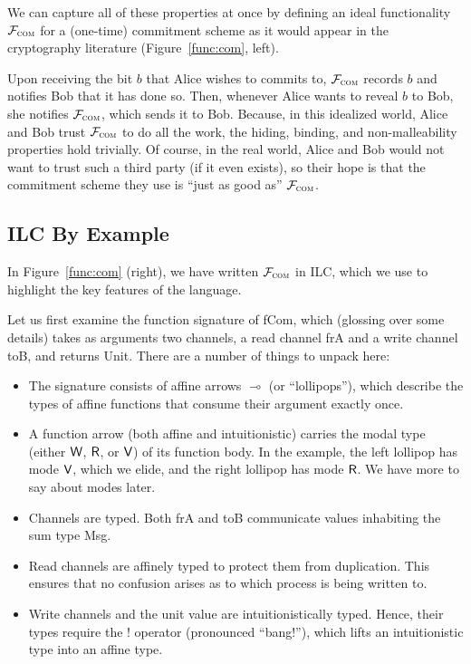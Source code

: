   We can capture all of these properties at once by defining an ideal
functionality $\mathcal{{F}}_{\textsc{com}}$ for a (one-time) commitment scheme as it
would appear in the cryptography literature (Figure~\ref{func:com}, left).

Upon receiving the bit $b$ that Alice wishes to commits to,
$\mathcal{{F}}_{\textsc{com}}$ records $b$ and notifies Bob that it has done so. Then,
whenever Alice wants to reveal $b$ to Bob, she notifies $\mathcal{{F}}_{\textsc{com}}$,
which sends it to Bob. Because, in this idealized world, Alice and Bob trust
$\mathcal{{F}}_{\textsc{com}}$ to do all the work, the hiding, binding, and
non-malleability properties hold trivially. Of course, in the real world, Alice
and Bob would not want to trust such a third party (if it even exists), so their
hope is that the commitment scheme they use is ``just as good as''
$\mathcal{{F}}_{\textsc{com}}$.\smallskip

\subsection{ILC By Example}
\label{subsec:ilc-flavored}

In Figure~\ref{func:com} (right), we have written $\mathcal{{F}}_{\textsc{com}}$ in ILC,
which we use to highlight the key features of the language. \smallskip

 Let us first examine the function signature of
\textsf{fCom}, which (glossing over some details) takes as arguments two
channels, a read channel \textsf{frA} and a write channel \textsf{toB}, and
returns \textsf{Unit}. There are a number of things to unpack here:

\begin{itemize}[leftmargin=*]
  \item The signature consists of affine arrows $\multimap$ (or ``lollipops''), which
    describe the types of affine functions that consume their argument exactly
    once.
  \item A function arrow (both affine and intuitionistic) carries the modal type
    (either $\textsf{W}$, $\textsf{R}$, or $\textsf{V}$) of its function body. In the example, the
    left lollipop has mode $\textsf{V}$, which we elide, and the right lollipop has
    mode $\textsf{R}$. We have more to say about modes later.
  \item Channels are typed. Both \textsf{frA} and \textsf{toB} communicate
    values inhabiting the sum type \textsf{Msg}.
  \item Read channels are affinely typed to protect them from duplication. This
    ensures that no confusion arises as to which process is being written to.
  \item Write channels and the unit value are intuitionistically typed. Hence,
    their types require the ! operator (pronounced ``bang!''), which lifts an
    intuitionistic type into an affine type.
\end{itemize}

